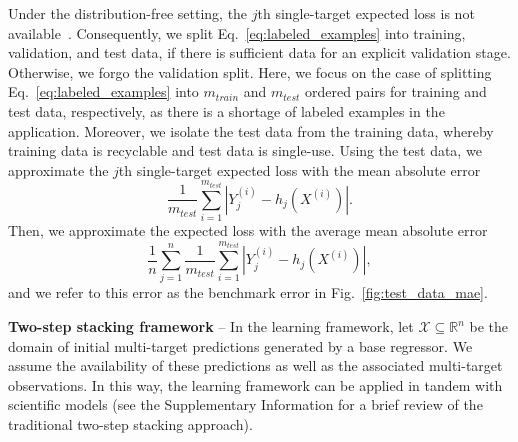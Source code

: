\documentclass[aps,twocolumn,superscriptaddress,floatfix,preprintnumbers,showkeys]{revtex4}
\begin{document}
Under the distribution-free setting, the $j$th single-target expected loss is not available~\cite{Haussler_1992, Kearns_1994_1, Kearns_1994_2, Friedman_2001, Friedman_2003, Hastie_2009}. Consequently, we split Eq.~\ref{eq:labeled_examples} into training, validation, and test data, if there is sufficient data for an explicit validation stage. Otherwise, we forgo the validation split. Here, we focus on the case of splitting Eq.~\ref{eq:labeled_examples} into $m_{train}$ and $m_{test}$ ordered pairs for training and test data, respectively, as there is a shortage of labeled examples in the application. Moreover, we isolate the test data from the training data, whereby training data is recyclable and test data is single-use. Using the test data, we approximate the $j$th single-target expected loss with the mean absolute error 
\begin{equation}
\label{eq:single_target_test_error}
\frac{1}{m_{test}} \sum_{i=1}^{m_{test}} |Y^{(i)}_{j} - h_{j}(X^{(i)})|.
\end{equation}
Then, we approximate the expected loss with the average mean absolute error
\begin{equation}
\label{eq:multi_target_test_error}
\frac{1}{n} \sum_{j=1}^{n} \frac{1}{m_{test}} \sum_{i=1}^{m_{test}} |Y^{(i)}_{j} - h_{j}(X^{(i)})|,
\end{equation}
and we refer to this error as the benchmark error in Fig.~\ref{fig:test_data_mae}.

\textbf{Two-step stacking framework} -- In the learning framework, let $\mathcal{X} \subseteq \mathbb{R}^{n}$ be the domain of initial multi-target predictions generated by a base regressor. We assume the availability of these predictions as well as the associated multi-target observations. In this way, the learning framework can be applied in tandem with scientific models (see the Supplementary Information for a brief review of the traditional two-step stacking approach). 
\end{document}
